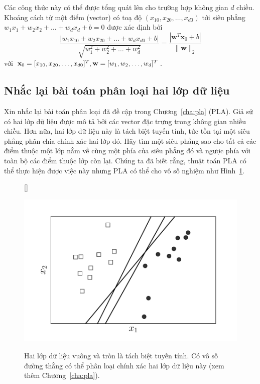 Các công thức này có thể được tổng quát lên cho trường hợp không gian $d$ chiều.
Khoảng cách từ một điểm (vector) có toạ độ $(x_{10}, x_{20}, \dots, x_{d0})$ tới
{siêu phẳng} $w_1x_1 + w_2x_2 +
\dots + w_dx_d   + b = 0$ được xác định bởi
\begin{equation*}
\frac{|w_1x_{10} + w_2x_{20} + \dots +
w_dx_{d0} + b|}{\sqrt{w_1^2 + w_2^2 + \dots +
w_d^2}} = \frac{|\mathbf{w}^T\mathbf{x}_0 + b|}{\|\mathbf{w}\|_2}
\end{equation*}
với $\mathbf{x}_0 = [x_{10}, x_{20}, \dots, x_{d0}]^T, \mathbf{w} = [w_1, w_2,
\dots, w_d]^T$.


\subsection{Nhắc lại bài toán phân loại hai lớp dữ liệu}

Xin nhắc lại bài toán phân loại đã đề cập trong
Chương~\ref{cha:pla} (PLA). Giả sử có hai
lớp dữ liệu được mô tả bởi các vector đặc trưng trong không gian nhiều
chiều. Hơn nữa, hai lớp dữ liệu này là tách biệt tuyến tính, tức tồn
tại một siêu phẳng phân chia chính xác hai lớp đó. Hãy tìm một siêu phẳng sao cho tất cả các điểm thuộc một lớp nằm về cùng một
phía của siêu phẳng đó và ngược phía với toàn bộ các điểm thuộc lớp còn lại.
Chúng ta đã biết rằng, thuật toán PLA có thể thực hiện được việc này nhưng PLA có thể cho vô số nghiệm như Hình~\ref{fig:19_linsep}.

\begin{figure}[t]
[\FBwidth]
{\caption[]{Hai lớp dữ liệu vuông và tròn là tách biệt tuyến tính. Có
vô số đường thằng có thể phân loại chính xác hai lớp dữ liệu này (xem
thêm Chương~\ref{cha:pla}).}
\label{fig:19_linsep}}
{\includegraphics[width = .5\textwidth]{ebookML_src/src/svm/svm1.pdf}}
\end{figure}

